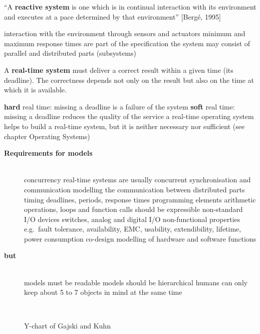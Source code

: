 {``A \textbf{reactive system} is one which is in continual interaction
  with its environment and executes at a pace determined by
  that environment'' [Berg\'{e}, 1995]}

\bi
	\ite interaction with the environment through sensors and actuators
	\ite minimum and maximum response times are part of the specification
	\ite the system may consist of parallel and distributed parts (subsystems)
\ei

{A \textbf{real-time system} must deliver a correct result within a given time (its deadline). The correctness depends not only on the result but also on the time at which it is available.}

\bi
	\ite \textbf{hard} real time: missing a deadline is a failure of the system
	\ite \textbf{soft} real time: missing a deadline reduces the quality of the service
	\ite a real-time operating system helps to build a real-time system, but it is neither necessary nor sufficient (see chapter Operating Systems)
\ei

\os{\newpage}
\begin{description}
\item[{\rot\bf Requirements for models}]~\\[-\lblskip]
\bi
	\ite concurrency \pr real-time systems are usually concurrent
	\ite synchronisation and communication \pr modelling the communication between distributed parts
	\ite timing \pr deadlines, periods, response times
	\ite programming elements \pr arithmetic operations, loops and function calls should be expressible
	\ite non-standard I/O devices \pr switches, analog and digital I/O
	\ite non-functional properties \pr e.g.\ fault tolerance, availability, EMC, usability, extendibility, lifetime, power consumption
	\ite co-design \pr modelling of hardware and software functions
\ei
\item[{\rot\bf but}]~\\[-\lblskip]
\bi
	\ite models must be readable
	\ite models should be hierarchical \pr humans can only keep about 5 to 7 objects in mind at the same time
\ei
{}
\end{description}

\begin{figure}[!hbtp]
     \begin{center}
	  \\
	  \caption{Y-chart of Gajski and Kuhn}
     \end{center}
\end{figure}
\os{\newpage}

